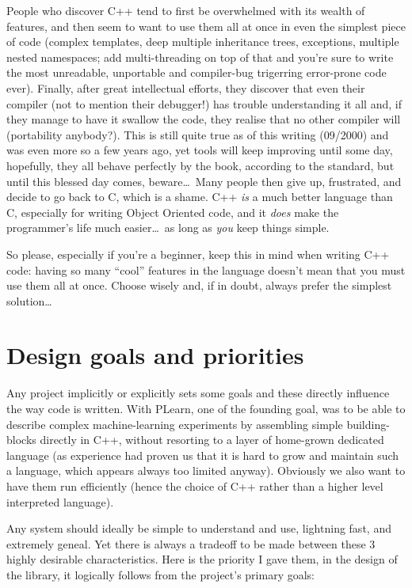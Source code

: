 \documentclass[11pt]{book}
\begin{document}
People who discover C++ tend to first be overwhelmed with its wealth
of features, and then seem to want to use them all at once in even the
simplest piece of code (complex templates, deep multiple inheritance
trees, exceptions, multiple nested namespaces; add multi-threading on
top of that and you're sure to write the most unreadable, unportable
and compiler-bug trigerring error-prone code ever). Finally, after
great intellectual efforts, they discover that even their compiler
(not to mention their debugger!) has trouble understanding it all
and, if they manage to have it swallow the code, they realise that
no other compiler will (portability anybody?). This is still quite
true as of this writing (09/2000) and was even more so a few years
ago, yet tools will keep improving until some day, hopefully, they
all behave perfectly by the book, according to the standard, but
until this blessed day comes, beware\ldots\ Many people then give up,
frustrated, and decide to go back to C, which is a shame. C++ \emph{is}
a much better language than C, especially for writing Object Oriented
code, and it \emph{does} make the programmer's life much easier\ldots\
as long as \emph{you} keep things simple.


 So please, especially if you're a beginner, keep this in mind
when writing C++ code: having so many ``cool'' features in the language
doesn't mean that you must use them all at once. Choose wisely and,
if in doubt, always prefer the simplest solution\ldots

\section{Design goals and priorities}

 Any project implicitly or explicitly sets some goals and these
directly influence the way code is written. With PLearn, one of the
founding goal, was to be able to describe complex machine-learning
experiments by assembling simple building-blocks directly in C++,
without resorting to a layer of home-grown dedicated language (as
experience had proven us that it is hard to grow and maintain such
a language, which appears always too limited anyway). Obviously
we also want to have them run efficiently (hence the choice of C++
rather than a higher level interpreted language).

 Any system should ideally be simple to understand and use, lightning
fast, and extremely geneal. Yet there is always a tradeoff to be made
between these 3 highly desirable characteristics. Here is the priority
I gave them, in the design of the library, it logically follows from
the project's primary goals:
\end{document}
